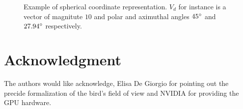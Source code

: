 \documentclass[journal,transmag]{IEEEtran}
\begin{document}
\begin{figure}
    \caption{Example of spherical coordinate representation. $V_d$ for
    instance is a vector of magnitute $10$ and polar and aximuthal angles
    $45\degree$ and $27.94\degree$ respectively.}%
    \label{fig:example}%
\end{figure}

\section*{Acknowledgment}
The authors would like acknowledge, Elisa De Giorgio for pointing out the
precide formalization of  the bird's field of view and NVIDIA for providing the
GPU hardware.

\ifCLASSOPTIONcaptionsoff
\newpage
\fi
\end{document}
